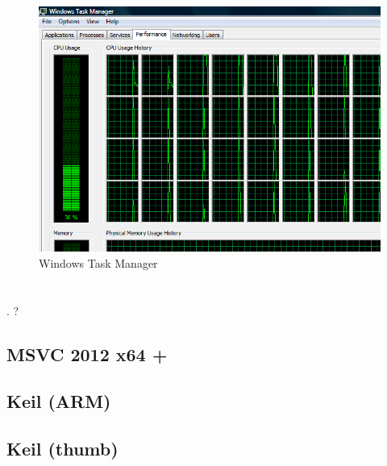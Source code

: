 \begin{figure}[H]
\centering
\includegraphics[scale=0.66]{exercises/taskmgr_64cpu_crop.png}
\caption{ Windows Task Manager}
\end{figure}

\section{}

.
?

\subsection{MSVC 2012 x64 + \Ox}



\subsection{Keil (ARM)}



\subsection{Keil (thumb)}



\section{}

